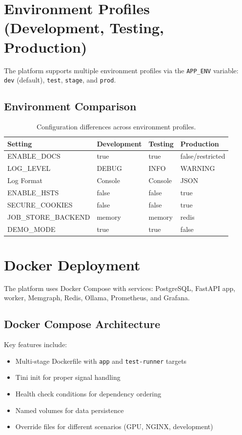 \documentclass[a4paper,twoside]{sapthesis}
\begin{document}
\section{Environment Profiles (Development, Testing, Production)}
\label{sec:env-profiles}

The platform supports multiple environment profiles via the \texttt{APP\_ENV} variable: \texttt{dev} (default), \texttt{test}, \texttt{stage}, and \texttt{prod}.

\subsection{Environment Comparison}

\begin{table}[ht]
\centering
\caption{Configuration differences across environment profiles.}
\label{tab:env-comparison}
\small
\begin{tabular}{llll}
\hline
\textbf{Setting} & \textbf{Development} & \textbf{Testing} & \textbf{Production} \\
\midrule
ENABLE\_DOCS & true & true & false/restricted \\
LOG\_LEVEL & DEBUG & INFO & WARNING \\
Log Format & Console & Console & JSON \\
ENABLE\_HSTS & false & false & true \\
SECURE\_COOKIES & false & false & true \\
JOB\_STORE\_BACKEND & memory & memory & redis \\
DEMO\_MODE & true & true & false \\
\midrule
\end{tabular}
\end{table}

\section{Docker Deployment}
\label{sec:docker-deployment}

The platform uses Docker Compose with services: PostgreSQL, FastAPI app, worker, Memgraph, Redis, Ollama, Prometheus, and Grafana.

\subsection{Docker Compose Architecture}

Key features include:
\begin{itemize}
    \item Multi-stage Dockerfile with \texttt{app} and \texttt{test-runner} targets
    \item Tini init for proper signal handling
    \item Health check conditions for dependency ordering
    \item Named volumes for data persistence
    \item Override files for different scenarios (GPU, NGINX, development)
\end{itemize}
\end{document}
